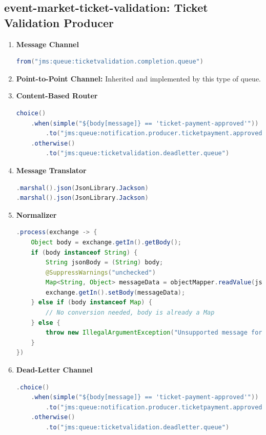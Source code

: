 \documentclass{article}
\begin{document}
\subsection{event-market-ticket-validation: Ticket Validation Producer}
\begin{enumerate}
    \item \textbf{Message Channel}
\begin{lstlisting}[language=Java, caption={Message Channel for Ticket Validation}]
from("jms:queue:ticketvalidation.completion.queue")
\end{lstlisting}
    \item \textbf{Point-to-Point Channel:} Inherited and implemented by this type of queue.
    \item \textbf{Content-Based Router}
\begin{lstlisting}[language=Java, caption={Content-Based Router for Ticket Validation}]
choice()
    .when(simple("${body[message]} == 'ticket-payment-approved'"))
        .to("jms:queue:notification.producer.ticketpayment.approved.queue")
    .otherwise()
        .to("jms:queue:ticketvalidation.deadletter.queue")
\end{lstlisting}
    \item \textbf{Message Translator}
\begin{lstlisting}[language=Java, caption={Message Translator for Ticket Validation}]
.marshal().json(JsonLibrary.Jackson)
.marshal().json(JsonLibrary.Jackson)
\end{lstlisting}
    \item \textbf{Normalizer}
\begin{lstlisting}[language=Java, caption={Normalizer for Ticket Validation}]
.process(exchange -> {
    Object body = exchange.getIn().getBody();
    if (body instanceof String) {
        String jsonBody = (String) body;
        @SuppressWarnings("unchecked")
        Map<String, Object> messageData = objectMapper.readValue(jsonBody, Map.class);
        exchange.getIn().setBody(messageData);
    } else if (body instanceof Map) {
        // No conversion needed, body is already a Map
    } else {
        throw new IllegalArgumentException("Unsupported message format: " + body.getClass());
    }
})
\end{lstlisting}
    \item \textbf{Dead-Letter Channel}
\begin{lstlisting}[language=Java, caption={Dead-Letter Channel for Ticket Validation}]
.choice()
    .when(simple("${body[message]} == 'ticket-payment-approved'"))
        .to("jms:queue:notification.producer.ticketpayment.approved.queue")
    .otherwise()
        .to("jms:queue:ticketvalidation.deadletter.queue")
\end{lstlisting}
\end{enumerate}
\end{document}
